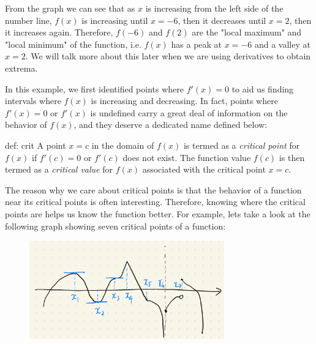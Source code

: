 \begin{remark}
    From the graph we can see that as $x$ is increasing from the left side of the number line, $f(x)$ is increasing until $x = -6$, then it decreases until $x = 2$, then it increases again.  Therefore, $f(-6)$ and $f(2)$ are the "local maximum" and "local minimum" of the function, i.e. $f(x)$ has a peak at $x = -6$ and a valley at $x = 2$.  We will talk more about this later when we are using derivatives to obtain extrema. 
\end{remark}

\begin{remark}
    In this example, we first identified points where $f'(x) = 0$ to aid us finding intervals where $f(x)$ is increasing and decreasing.  In fact, points where $f'(x) = 0$ or $f'(x)$ is undefined carry a great deal of information on the behavior of $f(x)$, and they deserve a dedicated name defined below:
\end{remark}

\begin{defi}{def: crit}
    A point $x=c$ in the domain of $f(x)$ is termed as a \textit{critical point} for $f(x)$ if $f'(c) = 0$ or $f'(c)$ does not exist.  The function value $f(c)$ is then termed as a \textit{critical value} for $f(x)$ associated with the critical point $x=c$.
\end{defi}

The reason why we care about critical points is that the behavior of a function near its critical points is often interesting.  Therefore, knowing where the critical points are helps us know the function better.  For example, lets take a look at the following graph showing seven critical points of a function:

\begin{figure}[ht]
    \centering
    \includegraphics[width = 0.75\textwidth]{figures/chap 05/critical_points.png}
    \label{fig: critical_points}
\end{figure}

